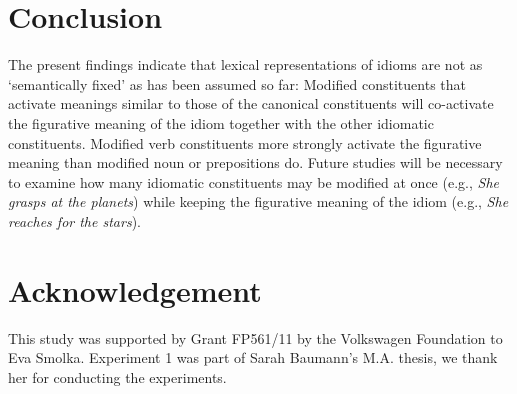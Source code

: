\section{Conclusion}
The present findings indicate that lexical representations of idioms are not as ‘semantically fixed’ as has been assumed so far: Modified constituents that activate meanings similar to those of the canonical constituents will co-activate the figurative meaning of the idiom together with the other idiomatic constituents. Modified verb constituents more strongly activate the figurative meaning than modified noun or prepositions do. Future studies will be necessary to examine how many idiomatic constituents may be modified at once (e.g., \textit{She grasps at the planets}) while keeping the figurative meaning of the idiom (e.g., \textit{She reaches for the stars}).

\section*{Acknowledgement}
This study was supported by Grant FP561/11 by the Volkswagen Foundation to Eva Smolka. Experiment 1 was part of Sarah Baumann's M.A. thesis, we thank her for conducting the experiments.

\let\cleardoublepage\clearpage

\printbibliography



